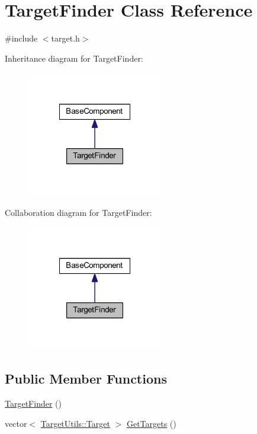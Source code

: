 \hypertarget{class_target_finder}{\section{\-Target\-Finder \-Class \-Reference}
\label{class_target_finder}
}


{\ttfamily \#include $<$target.\-h$>$}



\-Inheritance diagram for \-Target\-Finder\-:\nopagebreak
\begin{figure}[H]
\begin{center}
\leavevmode
\includegraphics[width=168pt]{class_target_finder__inherit__graph}
\end{center}
\end{figure}


\-Collaboration diagram for \-Target\-Finder\-:\nopagebreak
\begin{figure}[H]
\begin{center}
\leavevmode
\includegraphics[width=168pt]{class_target_finder__coll__graph}
\end{center}
\end{figure}
\subsection*{\-Public \-Member \-Functions}
\begin{DoxyCompactItemize}
\item 
\hyperlink{class_target_finder_a084f6537bbb501ad3ff1c0bcabe8e8a2}{\-Target\-Finder} ()
\item 
vector$<$ \hyperlink{struct_target_utils_1_1_target}{\-Target\-Utils\-::\-Target} $>$ \hyperlink{class_target_finder_aad532bf0e501eeac6a6d746f47e2baa9}{\-Get\-Targets} ()
\end{DoxyCompactItemize}
